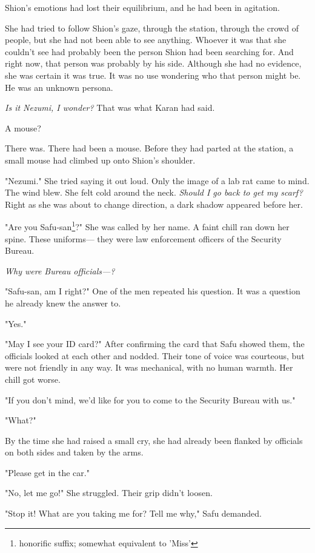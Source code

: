 Shion's emotions had lost their equilibrium, and he had been in
agitation.

She had tried to follow Shion's gaze, through the station, through the
crowd of people, but she had not been able to see anything. Whoever it
was that she couldn't see had probably been the person Shion had been
searching for. And right now, that person was probably by his side.
Although she had no evidence, she was certain it was true. It was no use
wondering who that person might be. He was an unknown persona.

\emph{Is it Nezumi, I wonder?} That was what Karan had said.

A mouse?

There was. There had been a mouse. Before they had parted at the
station, a small mouse had climbed up onto Shion's shoulder.

"Nezumi." She tried saying it out loud. Only the image of a lab rat came
to mind. The wind blew. She felt cold around the neck. \emph{Should I go back
to get my scarf?} Right as she was about to change direction, a dark
shadow appeared before her.

"Are you Safu-san\footnote{honorific suffix; somewhat equivalent to 'Miss'}?" She was called by her name. A faint chill ran down
her spine. These uniforms--- they were law enforcement officers of the
Security Bureau.

\emph{Why were Bureau officials---?}

"Safu-san, am I right?" One of the men repeated his question. It was a
question he already knew the answer to.

"Yes."

"May I see your ID card?" After confirming the card that Safu showed
them, the officials looked at each other and nodded. Their tone of voice
was courteous, but were not friendly in any way. It was mechanical, with
no human warmth. Her chill got worse.

"If you don't mind, we'd like for you to come to the Security Bureau
with us."

"What?"

By the time she had raised a small cry, she had already been flanked by
officials on both sides and taken by the arms.

"Please get in the car."

"No, let me go!" She struggled. Their grip didn't loosen.

"Stop it! What are you taking me for? Tell me why," Safu demanded.

